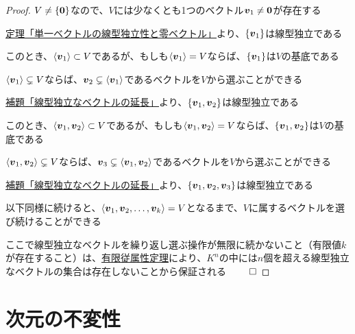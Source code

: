 \documentclass[../../../topic_linear-algebra]{subfiles}
\begin{document}
\begin{proof}
  $V \neq  \{\vb*{0} \}$なので、$V$には少なくとも1つのベクトル$\vb*{v}_1 \neq \vb*{0}$が存在する

  \hyperref[thm:single-vec-indep-iff-nonzero]{定理「単一ベクトルの線型独立性と零ベクトル」}より、$\{\vb*{v}_1 \}$は線型独立である

  \br

  このとき、$\langle \vb*{v}_1 \rangle \subset V$であるが、もしも$\langle \vb*{v}_1 \rangle = V$ならば、$\{\vb*{v}_1 \}$は$V$の基底である

  \br

  $\langle \vb*{v}_1 \rangle \subsetneq V$ならば、$\vb*{v}_2 \subsetneq \langle \vb*{v}_1 \rangle$であるベクトルを$V$から選ぶことができる

  \hyperref[thm:extend-indep-outside-subspace]{補題「線型独立なベクトルの延長」}より、$\{\vb*{v}_1, \vb*{v}_2 \}$は線型独立である

  \br

  このとき、$\langle \vb*{v}_1, \vb*{v}_2 \rangle \subset V$であるが、もしも$\langle \vb*{v}_1, \vb*{v}_2 \rangle = V$ならば、$\{\vb*{v}_1, \vb*{v}_2 \}$は$V$の基底である

  \br

  $\langle \vb*{v}_1, \vb*{v}_2 \rangle \subsetneq V$ならば、$\vb*{v}_3 \subsetneq \langle \vb*{v}_1, \vb*{v}_2 \rangle$であるベクトルを$V$から選ぶことができる

  \hyperref[thm:extend-indep-outside-subspace]{補題「線型独立なベクトルの延長」}より、$\{\vb*{v}_1, \vb*{v}_2, \vb*{v}_3 \}$は線型独立である

  \br

  以下同様に続けると、$\langle \vb*{v}_1, \vb*{v}_2, \dots, \vb*{v}_k \rangle = V$となるまで、$V$に属するベクトルを選び続けることができる

  \br

  ここで線型独立なベクトルを繰り返し選ぶ操作が無限に続かないこと（有限値$k$が存在すること）は、\hyperref[thm:finite-dependency]{有限従属性定理}により、$K^n$の中には$n$個を超える線型独立なベクトルの集合は存在しないことから保証される $\qed$
\end{proof}

\sectionline
\section{次元の不変性}
\end{document}
